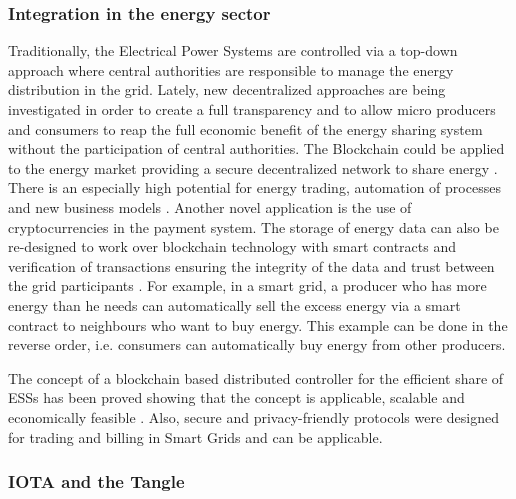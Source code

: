 \subsubsection{Integration in the energy sector}

Traditionally, the Electrical Power Systems are controlled via a top-down approach where central authorities are responsible to manage the energy distribution in the grid. Lately, new decentralized approaches are being investigated in order to create a full transparency and to allow micro producers and consumers to reap the full economic benefit of the energy sharing system without the participation of central authorities. The Blockchain could be applied to the energy market providing a secure decentralized network to share energy \cite{Hasse2016}. There is an especially high potential for energy trading, automation of processes and new business models \cite{UseCasesforBlockchainTechnologyinEnergyCommodityTrading}. Another novel application is the use of cryptocurrencies in the payment system. The storage of energy data can also be re-designed to work over blockchain technology with smart contracts and verification of transactions ensuring the integrity of the data and trust between the grid participants \cite{ETHome:Opensourceblockchainbasedenergycommunitycontroller}. For example, in a smart grid, a producer who has more energy than he needs can automatically sell the excess energy via a smart contract to neighbours who want to buy energy. This example can be done in the reverse order, i.e. consumers can automatically buy energy from other producers.


 The concept of a blockchain based distributed controller for the efficient share of \acp{ESS}  has been proved showing that the concept is applicable, scalable and economically feasible \cite{ETHome:Opensourceblockchainbasedenergycommunitycontroller}. Also, secure and privacy-friendly protocols were designed for trading and billing in Smart Grids \cite{SecureandPrivacy-FriendlyLocalElectricityTradingandBillinginSmartGrid} and can be applicable. 

\subsubsection{IOTA and the Tangle}


